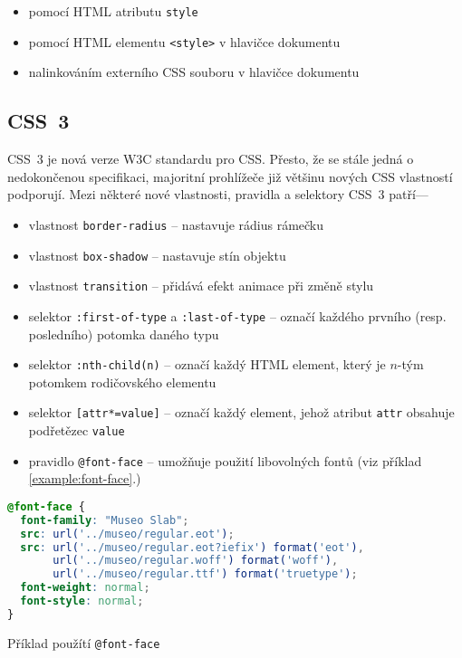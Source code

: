 \begin{itemize}
    \item pomocí HTML atributu \texttt{style}
    \item pomocí HTML elementu \texttt{<style>} v hlavičce dokumentu
    \item nalinkováním externího CSS souboru v hlavičce dokumentu
\end{itemize}

\subsection{CSS~3}

CSS~3 je nová verze W3C standardu pro CSS. Přesto, že se stále jedná o nedokončenou specifikaci, majoritní prohlížeče již většinu nových CSS vlastností podporují. Mezi některé nové vlastnosti, pravidla a selektory CSS~3 patří---

\begin{itemize}
    \item vlastnost \texttt{border-radius} -- nastavuje rádius rámečku
    \item vlastnost \texttt{box-shadow} -- nastavuje stín objektu
    \item vlastnost \texttt{transition} -- přidává efekt animace při změně stylu
    \item selektor \texttt{:first-of-type} a \texttt{:last-of-type} -- označí každého prvního (resp. posledního) potomka daného typu
    \item selektor \texttt{:nth-child(n)} -- označí každý HTML element, který je $n$-tým potomkem rodičovského elementu
    \item selektor \texttt{[attr*=value]} -- označí každý element, jehož atribut \texttt{attr} obsahuje podřetězec \texttt{value}
    \item pravidlo \texttt{@font-face} -- umožňuje použití libovolných fontů (viz příklad \ref{example:font-face}.)
\end{itemize}

\begin{example}
    \centering
    \begin{lstlisting}[language=css]
@font-face {
  font-family: "Museo Slab";
  src: url('../museo/regular.eot');
  src: url('../museo/regular.eot?iefix') format('eot'),
       url('../museo/regular.woff') format('woff'),
       url('../museo/regular.ttf') format('truetype');
  font-weight: normal;
  font-style: normal;
}
    \end{lstlisting}
    \caption{Příklad použítí \texttt{@font-face}}
    \label{example:font-face}
\end{example}

